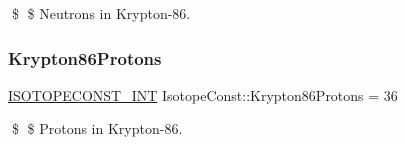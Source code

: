\$ \$ Neutrons in Krypton-\/86. \mbox{\label{group___isotope_const-_krypton-_kr86_ga45004b85262605c325bcc11d3831f95b}} 
\subsubsection{\texorpdfstring{Krypton86\+Protons}{Krypton86Protons}}
{\footnotesize\ttfamily \mbox{\hyperlink{group___isotope_const-_macros_ga5f18360b3e99483a35c32d789e62621c}{I\+S\+O\+T\+O\+P\+E\+C\+O\+N\+S\+T\+\_\+\+I\+NT}} Isotope\+Const\+::\+Krypton86\+Protons = 36}

\$ \$ Protons in Krypton-\/86. 